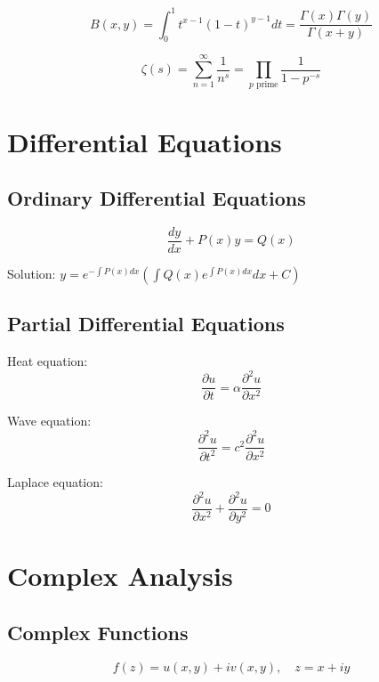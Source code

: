 \documentclass[11pt]{article}
\begin{document}
\begin{equation}
B(x,y) = \int_0^1 t^{x-1}(1-t)^{y-1} dt = \frac{\Gamma(x)\Gamma(y)}{\Gamma(x+y)}
\end{equation}

\begin{equation}
\zeta(s) = \sum_{n=1}^{\infty} \frac{1}{n^s} = \prod_{p \text{ prime}} \frac{1}{1-p^{-s}}
\end{equation}

\section{Differential Equations}

\subsection{Ordinary Differential Equations}
\begin{equation}
\frac{dy}{dx} + P(x)y = Q(x)
\end{equation}

Solution: $y = e^{-\int P(x)dx} \left(\int Q(x)e^{\int P(x)dx} dx + C\right)$

\subsection{Partial Differential Equations}
Heat equation:
\begin{equation}
\frac{\partial u}{\partial t} = \alpha \frac{\partial^2 u}{\partial x^2}
\end{equation}

Wave equation:
\begin{equation}
\frac{\partial^2 u}{\partial t^2} = c^2 \frac{\partial^2 u}{\partial x^2}
\end{equation}

Laplace equation:
\begin{equation}
\frac{\partial^2 u}{\partial x^2} + \frac{\partial^2 u}{\partial y^2} = 0
\end{equation}

\section{Complex Analysis}

\subsection{Complex Functions}
\begin{equation}
f(z) = u(x,y) + iv(x,y), \quad z = x + iy
\end{equation}
\end{document}
